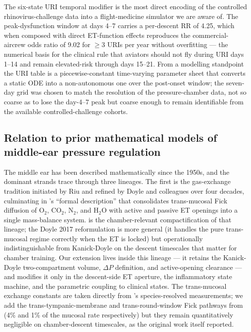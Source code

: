 \documentclass[11pt,a4paper]{article}
\begin{document}
The six-state URI temporal modifier is the most direct encoding of the controlled rhinovirus-challenge data \citep{McBride1989,Buchman1994,Doyle1999} into a flight-medicine simulator we are aware of. The peak-dysfunction window at days 4--7 carries a per-descent RR of 4.25, which when composed with direct ET-function effects reproduces the \citet{Lindfors2021} commercial-aircrew odds ratio of 9.02 for $\geq$3 URIs per year without overfitting --- the numerical basis for the clinical rule that aviators should not fly during URI days 1--14 and remain elevated-risk through days 15--21. From a modelling standpoint the URI table is a piecewise-constant time-varying parameter sheet that converts a static ODE into a non-autonomous one over the post-onset window; the seven-day grid was chosen to match the resolution of the \citet{Doyle2014} pressure-chamber data, not so coarse as to lose the day-4--7 peak but coarse enough to remain identifiable from the available controlled-challenge cohorts.

\subsection{Relation to prior mathematical models of middle-ear pressure regulation}

The middle ear has been described mathematically since the 1950s, and the dominant strands trace through three lineages. The first is the gas-exchange tradition initiated by Riu and refined by Doyle and colleagues over four decades, culminating in \citet{Doyle2017}'s ``formal description'' that consolidates trans-mucosal Fick diffusion of $\mathrm{O}_2$, $\mathrm{CO}_2$, $\mathrm{N}_2$, and $\mathrm{H}_2\mathrm{O}$ with active and passive ET openings into a single mass-balance system. \citet{Kanick2005} is the chamber-relevant compactification of that lineage; the Doyle 2017 reformulation is more general (it handles the pure trans-mucosal regime correctly when the ET is locked) but operationally indistinguishable from Kanick-Doyle on the descent timescales that matter for chamber training. Our extension lives inside this lineage --- it retains the Kanick-Doyle two-compartment volume, $\Delta P$ definition, and active-opening clearance --- and modifies it only in the descent-side ET aperture, the inflammatory state machine, and the parametric coupling to clinical states. The trans-mucosal exchange constants are taken directly from \citet{Doyle2011}'s species-resolved measurements; we add the trans-tympanic-membrane and trans-round-window Fick pathways from \citet{Doyle2017} (4\% and 1\% of the mucosal rate respectively) but they remain quantitatively negligible on chamber-descent timescales, as the original work itself reported.
\end{document}
